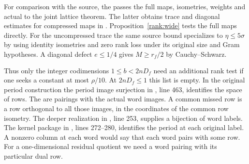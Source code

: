 For comparison with the source, the
passes the full
maps, isometries, weights and actual  to the joint lattice
theorem. The latter obtains trace and diagonal estimates for
compressed maps in .
Proposition~\ref{rank:wide} tests the full maps directly. For the
uncompressed trace the same source bound specializes to
\(\eta\le5\sigma\) by using identity isometries and zero rank loss
under its original size and Gram hypotheses. A diagonal defect
\(e\le1/4\) gives \(M\ge r_f/2\) by Cauchy--Schwarz.

Thus only the integer codimensions \(1\le b<2nD_f\) need an
additional rank test if one seeks a constant at most \(\rho/10\).
At \(2nD_f\le1\) this list is empty. In the original period
construction the period image surjection in ,
line 463, identifies the space of rows. The
are pairings with the actual word images. A common missed
row is a row orthogonal to all those images, in the coordinates of
the common row isometry. The deeper realization in ,
line 253, supplies a bijection of word labels. The kernel package in
, lines 272--280, identifies the period at
each original label. A nonzero column at each word would say that
each word pairs with some row. For a one-dimensional residual quotient
we need a word pairing with its particular dual row.

